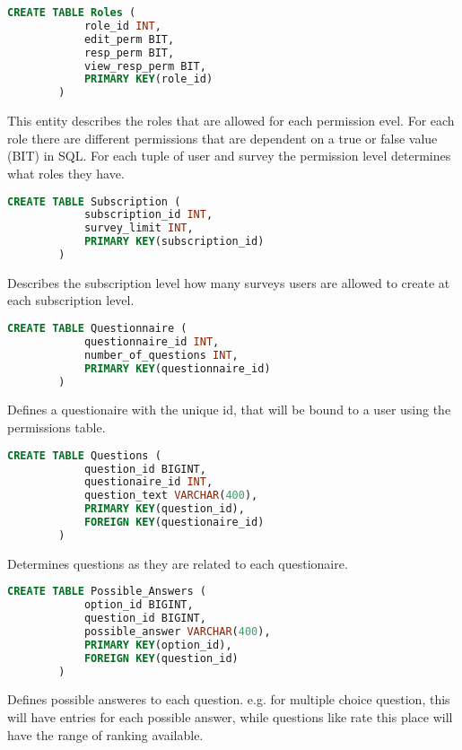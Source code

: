 \documentclass[12pt, oneside, a4paper]{article}
\begin{document}
    \begin{lstlisting}[language=SQL, columns=flexible]
        CREATE TABLE Roles (
            role_id INT,
            edit_perm BIT, 
            resp_perm BIT,
            view_resp_perm BIT,
            PRIMARY KEY(role_id)
        ) 
    \end{lstlisting}
    This entity describes the roles that are allowed for each permission evel. For each role there are different permissions that are dependent on a true or false value (BIT) in SQL. For each tuple of user and survey the permission level determines what roles they have.
    \\

    \begin{lstlisting}[language=SQL, columns=flexible]
        CREATE TABLE Subscription (
            subscription_id INT,
            survey_limit INT, 
            PRIMARY KEY(subscription_id)
        ) 
    \end{lstlisting}
    Describes the subscription level how many surveys users are allowed to create at each subscription level. 
    \\

    \begin{lstlisting}[language=SQL, columns=flexible]
        CREATE TABLE Questionnaire (
            questionnaire_id INT,
            number_of_questions INT, 
            PRIMARY KEY(questionnaire_id)
        ) 
    \end{lstlisting}
    Defines a questionaire with the unique id, that will be bound to a user using the permissions table. 
    \\

    \begin{lstlisting}[language=SQL, columns=flexible]
        CREATE TABLE Questions (
            question_id BIGINT,
            questionaire_id INT,
            question_text VARCHAR(400), 
            PRIMARY KEY(question_id),
            FOREIGN KEY(questionaire_id)
        ) 
    \end{lstlisting}
    Determines questions as they are related to each questionaire. 
    \\

    \begin{lstlisting}[language=SQL, columns=flexible]
        CREATE TABLE Possible_Answers (
            option_id BIGINT,
            question_id BIGINT, 
            possible_answer VARCHAR(400),
            PRIMARY KEY(option_id),
            FOREIGN KEY(question_id)
        ) 
    \end{lstlisting}
    Defines possible answeres to each question. e.g. for multiple choice question, this will have entries for each possible answer, while questions like rate this place will have the range of ranking available. 
    \\
\end{document}
